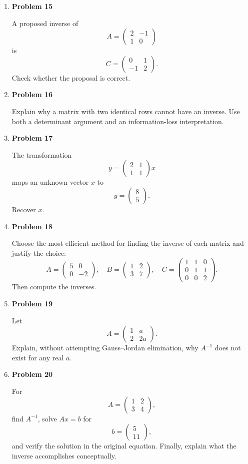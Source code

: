 \begin{enumerate}
\item \textbf{Problem 15}\par
A proposed inverse of
\[
A=\begin{pmatrix}2&-1\\1&0\end{pmatrix}
\]
is
\[
C=\begin{pmatrix}0&1\\-1&2\end{pmatrix}.
\]
Check whether the proposal is correct.

\item \textbf{Problem 16}\par
Explain why a matrix with two identical rows cannot have an inverse. Use both a determinant argument and an information-loss interpretation.

\item \textbf{Problem 17}\par
The transformation
\[
y=
\begin{pmatrix}2&1\\1&1\end{pmatrix}x
\]
maps an unknown vector \(x\) to
\[
y=\begin{pmatrix}8\\5\end{pmatrix}.
\]
Recover \(x\).

\item \textbf{Problem 18}\par
Choose the most efficient method for finding the inverse of each matrix and justify the choice:
\[
A=\begin{pmatrix}5&0\\0&-2\end{pmatrix},
\quad
B=\begin{pmatrix}1&2\\3&7\end{pmatrix},
\quad
C=\begin{pmatrix}1&1&0\\0&1&1\\0&0&2\end{pmatrix}.
\]
Then compute the inverses.

\item \textbf{Problem 19}\par
Let
\[
A=\begin{pmatrix}
1&a\\
2&2a
\end{pmatrix}.
\]
Explain, without attempting Gauss--Jordan elimination, why \(A^{-1}\) does not exist for any real \(a\).

\item \textbf{Problem 20}\par
For
\[
A=\begin{pmatrix}
1&2\\
3&4
\end{pmatrix},
\]
find \(A^{-1}\), solve \(Ax=b\) for
\[
b=\begin{pmatrix}5\\11\end{pmatrix},
\]
and verify the solution in the original equation. Finally, explain what the inverse accomplishes conceptually.
\end{enumerate}


